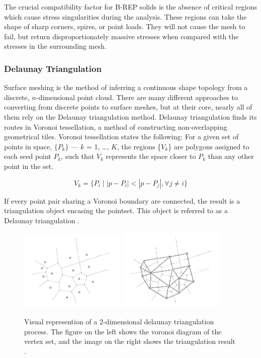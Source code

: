 \documentclass[12pt]{drexelthesis}
\let\Oldsubsubsection\subsubsection
\renewcommand{\subsubsection}{\FloatBarrier\Oldsubsubsection}
\begin{document}
The crucial compatibility factor for B-REP solids is the absence of critical regions which cause stress singularities during the analysis. These regions can take the shape of sharp corners, spires, or point loads. They will not cause the mesh to fail, but return disproportionately massive stresses when compared with the stresses in the surrounding mesh. 



\subsubsection{Delaunay Triangulation}
\label{subsubsec:delaunay}
Surface meshing is the method of inferring a continuous shape topology from a discrete, $n$-dimensional point cloud. There are many different approaches to converting from discrete points to surface meshes, but at their core, nearly all of them rely on the Delaunay triangulation method.
Delaunay triangulation finds its routes in Voronoi tessellation, a method of constructing non-overlapping geometrical tiles. Voronoi tessellation states the following:
For a given set of points in space, $\{P_{k}\}$ --- $k$ = 1, \ldots, $K$, the regions \{$V_{k}$\} are polygons assigned to each seed point $P_{k}$, such that $V_{k}$ represents the space closer to $P_{k}$ than any other point in the set.

\begin{equation}
	V_{k} = \{P_{i} \mid |p - P_{i}| < |p - P_{j}|, \forall j \neq i \}
\end{equation}

If every point pair sharing a Voronoi boundary are connected, the result is a triangulation object encasing the pointset. This object is referred to as a Delaunay triangulation \cite{RN65}.

\begin{figure}[!ht]
	\centering
		\includegraphics[width=2in]{delaunayTriangulation/voronoi.jpg}
		\includegraphics[width=2in]{delaunayTriangulation/delaunay.jpg}
	\caption[2D delaunay triangulation]{\centering Visual represention of a 2-dimensional delaunay triangulation process. The figure on the left shows the voronoi diagram of the vertex set, and the image on the right shows the triangulation result \cite{RN65}.}
\end{figure}
\end{document}
